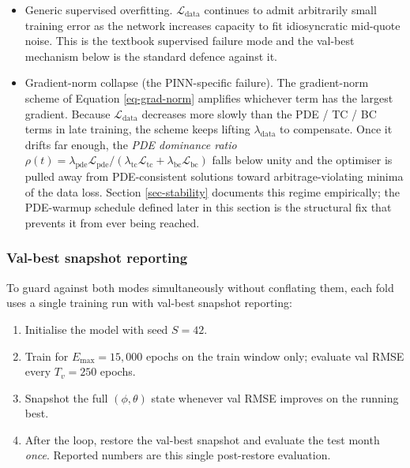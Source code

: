 \documentclass[
  11pt,
]{article}
\providecommand{\tightlist}{%
  \setlength{\itemsep}{0pt}\setlength{\parskip}{0pt}}
\begin{document}
\begin{itemize}
\item
  Generic supervised overfitting. \(\mathcal{L}_\mathrm{data}\)
  continues to admit arbitrarily small training error as the network
  increases capacity to fit idiosyncratic mid-quote noise. This is the
  textbook supervised failure mode and the val-best mechanism below is
  the standard defence against it.
\item
  Gradient-norm collapse (the PINN-specific failure). The gradient-norm
  scheme of Equation \ref{eq-grad-norm} amplifies whichever term has the
  largest gradient. Because \(\mathcal{L}_\mathrm{data}\) decreases more
  slowly than the PDE / TC / BC terms in late training, the scheme keeps
  lifting \(\lambda_\mathrm{data}\) to compensate. Once it drifts far
  enough, the \emph{PDE dominance ratio}
  \(\rho(t) = \lambda_\mathrm{pde}\mathcal{L}_\mathrm{pde}/
  (\lambda_\mathrm{tc}\mathcal{L}_\mathrm{tc} +
  \lambda_\mathrm{bc}\mathcal{L}_\mathrm{bc})\) falls below unity and
  the optimiser is pulled away from PDE-consistent solutions toward
  arbitrage-violating minima of the data loss. Section
  \ref{sec-stability} documents this regime empirically; the PDE-warmup
  schedule defined later in this section is the structural fix that
  prevents it from ever being reached.
\end{itemize}

\subsubsection{Val-best snapshot
reporting}\label{val-best-snapshot-reporting}

To guard against both modes simultaneously without conflating them, each
fold uses a single training run with val-best snapshot reporting:

\begin{enumerate}
\def\labelenumi{\arabic{enumi}.}
\tightlist
\item
  Initialise the model with seed \(S=42\).
\item
  Train for \(E_\mathrm{max}=15,000\) epochs on the train window only;
  evaluate val RMSE every \(T_v{=}250\) epochs.
\item
  Snapshot the full \((\phi, \theta)\) state whenever val RMSE improves
  on the running best.
\item
  After the loop, restore the val-best snapshot and evaluate the test
  month \emph{once}. Reported numbers are this single post-restore
  evaluation.
\end{enumerate}
\end{document}
